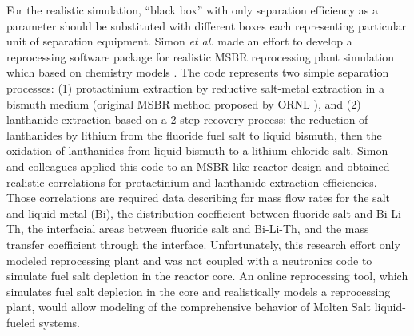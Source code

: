 For the realistic simulation, ``black box'' with only separation efficiency 
as a parameter should be substituted with different boxes each representing 
particular unit of
separation equipment. Simon \emph{et al.} made an effort to develop a 
reprocessing software package for realistic \gls{MSBR} reprocessing 
plant simulation which based on chemistry models \cite{simon_-line_2008}. 
The code represents two simple separation processes: (1) protactinium 
extraction by reductive salt-metal extraction in a bismuth medium (original 
\gls{MSBR} method proposed by \gls{ORNL} \cite{whatley_engineering_1970-1}), 
and (2) lanthanide extraction based on a 2-step recovery process: 
the reduction of 
lanthanides by lithium from the fluoride fuel salt to liquid bismuth, then the 
oxidation of lanthanides from liquid bismuth to a lithium chloride salt. Simon and 
colleagues applied this code to an \gls{MSBR}-like reactor design and 
obtained realistic 
correlations for protactinium and lanthanide extraction efficiencies. Those 
correlations are required data describing for mass flow rates for the salt 
and liquid metal (Bi), the distribution coefficient between fluoride salt 
and Bi-Li-Th, the interfacial areas 
between fluoride salt and Bi-Li-Th, and the mass transfer coefficient through the 
interface. Unfortunately, this research effort only modeled reprocessing plant 
and was not coupled with a neutronics code to simulate fuel salt depletion in 
the reactor core. An online reprocessing tool, which simulates fuel salt 
depletion in the core and realistically models a reprocessing plant, 
would allow modeling of the comprehensive behavior of  
Molten Salt liquid-fueled systems.

